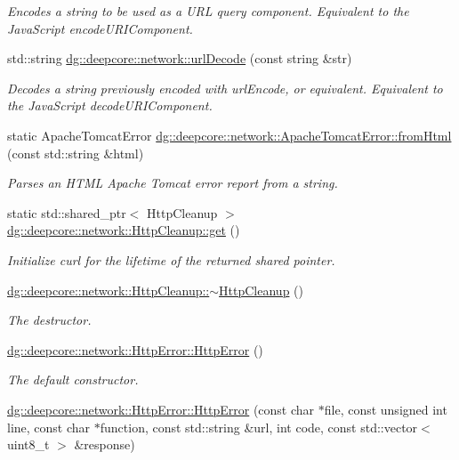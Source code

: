 \begin{DoxyCompactItemize}
\begin{DoxyCompactList}\small\item\em Encodes a string to be used as a U\+RL query component. Equivalent to the Java\+Script encode\+U\+R\+I\+Component. \end{DoxyCompactList}\item 
std\+::string \hyperlink{group___network_module_gae91a77df82de63d6bce7940e22d5db0e}{dg\+::deepcore\+::network\+::url\+Decode} (const string \&str)
\begin{DoxyCompactList}\small\item\em Decodes a string previously encoded with url\+Encode, or equivalent. Equivalent to the Java\+Script decode\+U\+R\+I\+Component. \end{DoxyCompactList}\item 
static Apache\+Tomcat\+Error \hyperlink{group___network_module_ga84792c450664512e6891ecccbb205944}{dg\+::deepcore\+::network\+::\+Apache\+Tomcat\+Error\+::from\+Html} (const std\+::string \&html)
\begin{DoxyCompactList}\small\item\em Parses an H\+T\+ML Apache Tomcat error report from a string. \end{DoxyCompactList}\item 
static std\+::shared\+\_\+ptr$<$ Http\+Cleanup $>$ \hyperlink{group___network_module_ga039c8cd2070cc244714a28bdeddab074}{dg\+::deepcore\+::network\+::\+Http\+Cleanup\+::get} ()
\begin{DoxyCompactList}\small\item\em Initialize curl for the lifetime of the returned shared pointer. \end{DoxyCompactList}\item 
\hyperlink{group___network_module_gac517b1ec291e0fdcef96e8e7af54eb1d}{dg\+::deepcore\+::network\+::\+Http\+Cleanup\+::$\sim$\+Http\+Cleanup} ()
\begin{DoxyCompactList}\small\item\em The destructor. \end{DoxyCompactList}\item 
\hyperlink{group___network_module_ga14eeb0f4441dfb8f75d82c0cd940c0ec}{dg\+::deepcore\+::network\+::\+Http\+Error\+::\+Http\+Error} ()
\begin{DoxyCompactList}\small\item\em The default constructor. \end{DoxyCompactList}\item 
\hyperlink{group___network_module_ga03929fda967c6a3609d28953ac0fad55}{dg\+::deepcore\+::network\+::\+Http\+Error\+::\+Http\+Error} (const char $\ast$file, const unsigned int line, const char $\ast$function, const std\+::string \&url, int code, const std\+::vector$<$ uint8\+\_\+t $>$ \&response)

\end{DoxyCompactItemize}
